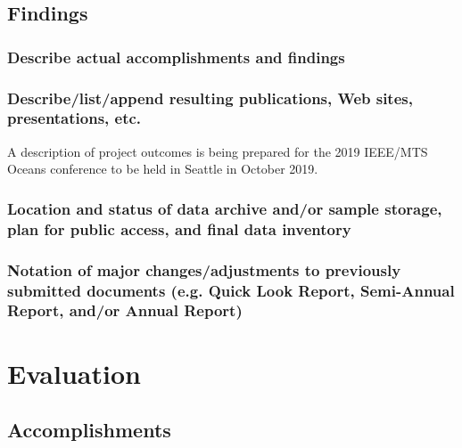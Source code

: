 \documentclass[letterpaper,12pt]{article}
\begin{document}
\subsection{Findings}
\subsubsection*{Describe actual accomplishments and findings}




\subsubsection*{Describe/list/append resulting publications, Web sites, presentations, etc.}


A description of project outcomes is being prepared for the 2019 IEEE/MTS Oceans conference to be held in Seattle in October 2019.

\subsubsection*{Location and status of data archive and/or sample storage, plan for public access, and final data inventory} 



\subsubsection*{Notation of major changes/adjustments to previously submitted documents (e.g.    Quick Look Report, Semi-Annual Report, and/or Annual Report)}

\section{Evaluation}

\subsection{Accomplishments}
\end{document}
